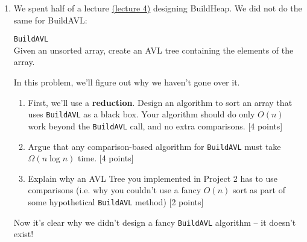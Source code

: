 \documentclass[12pt]{article}
\begin{document}
\begin{enumerate}
\item	
We spent half of a lecture \href{https://courses.cs.washington.edu/courses/cse332/18su/lectures/lecture04.pdf}{(lecture 4)} designing BuildHeap. We did not do the same for BuildAVL:
\begin{tcolorbox}
	\texttt{BuildAVL} \\
	Given an unsorted array, create an AVL tree containing the elements of the array.
\end{tcolorbox}
In this problem, we'll figure out why we haven't gone over it.
		\begin{enumerate}
			\item First, we'll use a \textbf{reduction}. Design an algorithm to sort an array that uses \texttt{BuildAVL} as a black box. Your algorithm should do only $O(n)$ work beyond the \texttt{BuildAVL} call, and no extra comparisons. [4 points]
			\item Argue that any comparison-based algorithm for \texttt{BuildAVL} must take $\Omega(n \log n)$ time. [4 points]
			\item Explain why an AVL Tree you implemented in Project 2 has to use comparisons (i.e. why you couldn't use a fancy $O(n)$ sort as part of some hypothetical \texttt{BuildAVL} method) [2 points]
		\end{enumerate}
	Now it's clear why we didn't design a fancy \texttt{BuildAVL} algorithm -- it doesn't exist!
	\end{enumerate}
\end{document}
